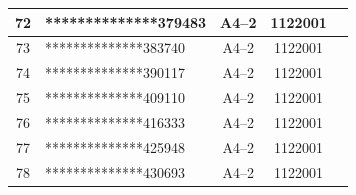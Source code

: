 \documentclass[UTF8,10pt,a4paper,fontset=fandol]{ctexart}
\newcommand{\fieldvalue}[1]{#1}
\begin{document}
\begin{center}
\begin{tabular}{|c|p{4.2cm}|c|c|p{2.0cm}|}
\fieldvalue{72} &
\fieldvalue{**************379483} &
\fieldvalue{A4--2} &
\fieldvalue{1122001} & \\ \hline
\fieldvalue{73} &
\fieldvalue{**************383740} &
\fieldvalue{A4--2} &
\fieldvalue{1122001} & \\ \hline
\fieldvalue{74} &
\fieldvalue{**************390117} &
\fieldvalue{A4--2} &
\fieldvalue{1122001} & \\ \hline
\fieldvalue{75} &
\fieldvalue{**************409110} &
\fieldvalue{A4--2} &
\fieldvalue{1122001} & \\ \hline
\fieldvalue{76} &
\fieldvalue{**************416333} &
\fieldvalue{A4--2} &
\fieldvalue{1122001} & \\ \hline
\fieldvalue{77} &
\fieldvalue{**************425948} &
\fieldvalue{A4--2} &
\fieldvalue{1122001} & \\ \hline
\fieldvalue{78} &
\fieldvalue{**************430693} &
\fieldvalue{A4--2} &
\fieldvalue{1122001} & \\ \hline

\end{tabular}
\end{center}
\end{document}
